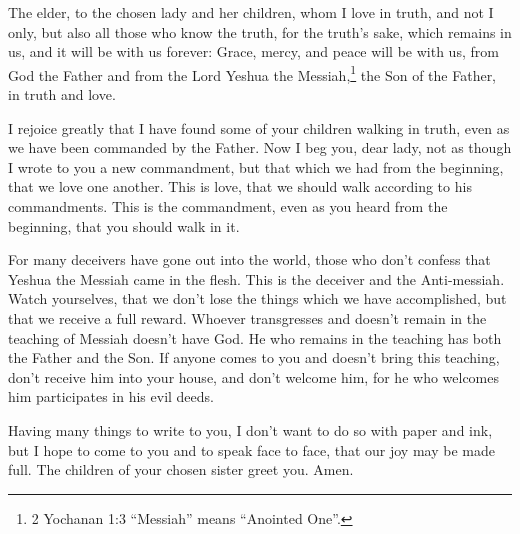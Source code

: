 
%

\vspace{-1.4in}


\mychapter{}  \myverse*{}The elder, to the chosen lady and her children, whom I love in truth, and not I only, but also all those who know the truth, \myverse{}for the truth’s sake, which remains in us, and it will be with us forever: \myverse{}Grace, mercy, and peace will be with us, from God the Father and from the Lord Yeshua the Messiah,\footnote{ 2 Yochanan 1:3  “Messiah” means “Anointed One”.} the Son of the Father, in truth and love.


\myverse{}I rejoice greatly that I have found some of your children walking in truth, even as we have been commanded by the Father. \myverse{}Now I beg you, dear lady, not as though I wrote to you a new commandment, but that which we had from the beginning, that we love one another. \myverse{}This is love, that we should walk according to his commandments. This is the commandment, even as you heard from the beginning, that you should walk in it.


\myverse{}For many deceivers have gone out into the world, those who don’t confess that Yeshua the Messiah came in the flesh. This is the deceiver and the Anti-messiah. \myverse{}Watch yourselves, that we don’t lose the things which we have accomplished, but that we receive a full reward. \myverse{}Whoever transgresses and doesn’t remain in the teaching of Messiah doesn’t have God. He who remains in the teaching has both the Father and the Son. \myverse{}If anyone comes to you and doesn’t bring this teaching, don’t receive him into your house, and don’t welcome him, \myverse{}for he who welcomes him participates in his evil deeds.


\myverse{}Having many things to write to you, I don’t want to do so with paper and ink, but I hope to come to you and to speak face to face, that our joy may be made full. \myverse{}The children of your chosen sister greet you. Amen.


